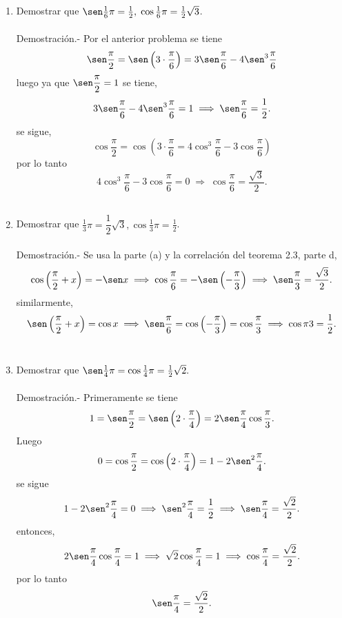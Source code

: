 \begin{enumerate}
\begin{enumerate}[\bfseries (a)]
    \item Demostrar que $\sen \frac{1}{6}\pi=\frac{1}{2},\; \cos \frac{1}{6}\pi = \frac{1}{2}\sqrt{3}$.\\\\
	Demostración.-\; Por el anterior problema se tiene $$\sen\dfrac{\pi}{2}=\sen\left(3\cdot \dfrac{\pi}{6}\right)  =3 \sen \dfrac{\pi}{6}-4\sen^3 \dfrac{\pi}{6}$$
	luego ya que $\sen\dfrac{\pi}{2}=1$ se tiene, 
	$$3\sen\dfrac{\pi}{6}-4\sen^3\dfrac{\pi}{6}=1 \; \Longrightarrow \; \sen\dfrac{\pi}{6}=\dfrac{1}{2}.$$
	se sigue, $$\cos\dfrac{\pi}{2}=\cos\left(3\cdot \dfrac{\pi}{6} = 4\cos^3\dfrac{\pi}{6}-3\cos\dfrac{\pi}{6}\right)$$
	por lo tanto $$4\cos^3\dfrac{\pi}{6}-3\cos\dfrac{\pi}{6}=0 \; \Longrightarrow \; \cos\dfrac{\pi}{6}=\dfrac{\sqrt{3}}{2}.$$\\

    \item Demostrar que $\frac{1}{3}\pi = \dfrac{1}{2}\sqrt{3}, \cos\frac{1}{3}\pi = \frac{1}{2}$.\\\\
	Demostración.-\; Se usa la parte (a) y la correlación del teorema 2.3, parte d,
	$$\cos\left(\dfrac{\pi}{2}+x\right) = -\sen x \; \Longrightarrow \; \cos\dfrac{\pi}{6}=-\sen\left(-\dfrac{\pi}{3}\right) \; \Longrightarrow \; \sen\dfrac{\pi}{3}=\dfrac{\sqrt{3}}{2}.$$
	similarmente,
	$$\sen\left(\dfrac{\pi}{2}+x\right) = \cos x \; \Longrightarrow \; \sen\dfrac{\pi}{6} = \cos\left(-\dfrac{\pi}{3}\right)=\cos\dfrac{\pi}{3} \; \Longrightarrow \; \cos{\pi}{3}=\dfrac{1}{2}.$$\\

    \item Demostrar que $\sen\frac{1}{4} \pi = \cos\frac{1}{4}\pi = \frac{1}{2}\sqrt{2}.$\\\\
	Demostración.-\; Primeramente se tiene $$1=\sen\dfrac{\pi}{2} = \sen\left(2\cdot \dfrac{\pi}{4}\right) = 2\sen\dfrac{\pi}{4}\cos\dfrac{\pi}{3}.$$
	Luego $$0=\cos\dfrac{\pi}{2}=\cos\left(2\cdot \dfrac{\pi}{4}\right)=1-2\sen^2 \dfrac{\pi}{4}.$$
	se sigue $$1-2\sen^2\dfrac{\pi}{4}=0 \; \Longrightarrow \; \sen^2 \dfrac{\pi}{4} = \dfrac{1}{2} \; \Longrightarrow \; \sen \dfrac{\pi}{4}=\dfrac{\sqrt{2}}{2}.$$
	    entonces, $$2\sen\dfrac{\pi}{4}\cos\dfrac{\pi}{4}=1 \; \Longrightarrow\; \sqrt{2}\cos \dfrac{\pi}{4}=1 \; \Longrightarrow\; \cos \dfrac{\pi}{4}=\dfrac{\sqrt{2}}{2}.$$
	    por lo tanto $$\sen\dfrac{\pi}{4}=\dfrac{\sqrt{2}}{2}.$$\\


\end{enumerate}
\end{enumerate}
